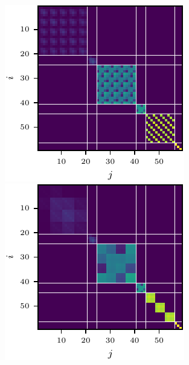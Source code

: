 \begin{figure}[!h]
\begin{minipage}[t]{0.495\linewidth}
  \end{minipage}
  \\
  \begin{minipage}[t]{0.495\linewidth}
    \centering
    \includegraphics[width=\linewidth]{../kfs/plots/synthetic_cvec_ggn_bda.pdf}
  \end{minipage}
  \hfill
  \begin{minipage}[t]{0.495\linewidth}
    \centering
    \includegraphics[width=\linewidth]{../kfs/plots/synthetic_rvec_ggn_bda.pdf}

\end{minipage}
\end{figure}
